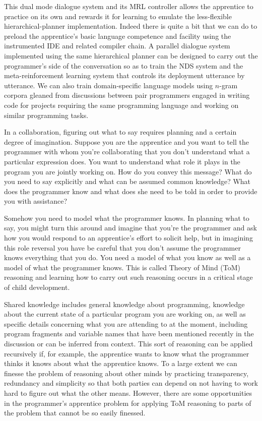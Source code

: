 This dual mode dialogue system and its MRL controller allows the apprentice to practice on its own and rewards it for learning to emulate the less-flexible hierarchical-planner implementation. Indeed there is quite a bit that we can do to preload the apprentice’s basic language competence and facility using the instrumented IDE and related compiler chain. A parallel dialogue system implemented using the same hierarchical planner can be designed to carry out the programmer’s side of the conversation so as to train the NDS system and the meta-reinforcement learning system that controls its deployment utterance by utterance. We can also train domain-specific language models using $n$-gram corpora gleaned from discussions between pair programmers engaged in writing code for projects requiring the same programming language and working on similar programming tasks.




In a collaboration, figuring out what to say requires planning and a certain degree of imagination. Suppose you are the apprentice and you want to tell the programmer with whom you're collaborating that you don't understand what a particular expression does. You want to understand what role it plays in the program you are jointly working on. How do you convey this message? What do you need to say explicitly and what can be assumed common knowledge? What does the programmer know and what does she need to be told in order to provide you with assistance?

Somehow you need to model what the programmer knows. In planning what to say, you might turn this around and imagine that you're the programmer and ask how you would respond to an apprentice's effort to solicit help, but in imagining this role reversal you have be careful that you don't assume the programmer knows everything that you do. You need a model of what you know as well as a model of what the programmer knows. This is called Theory of Mind (ToM) reasoning and learning how to carry out such reasoning occurs in a critical stage of child development.

Shared knowledge includes general knowledge about programming, knowledge about the current state of a particular program you are working on, as well as specific details concerning what you are attending to at the moment, including program fragments and variable names that have been mentioned recently in the discussion or can be inferred from context. This sort of reasoning can be applied recursively if, for example, the apprentice wants to know what the programmer thinks it knows about what the apprentice knows. To a large extent we can finesse the problem of reasoning about other minds by practicing transparency, redundancy and simplicity so that both parties can depend on not having to work hard to figure out what the other means. However, there are some opportunities in the programmer's apprentice problem for applying ToM reasoning to parts of the problem that cannot be so easily finessed.

